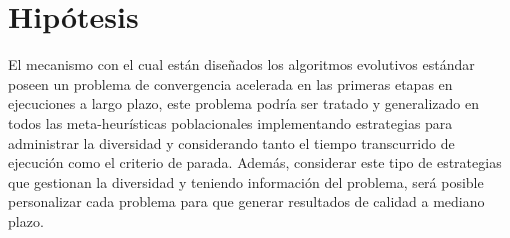 \section{Hipótesis}
El mecanismo con el cual están diseñados los algoritmos evolutivos estándar poseen un problema de convergencia acelerada en las primeras etapas en ejecuciones a largo plazo, este problema podría ser tratado y generalizado en todos las meta-heurísticas poblacionales implementando estrategias para administrar la diversidad y considerando tanto el tiempo transcurrido de ejecución como el criterio de parada.
%
Además, considerar este tipo de estrategias que gestionan la diversidad y teniendo información del problema, será posible personalizar cada problema para que generar resultados de calidad a mediano plazo.